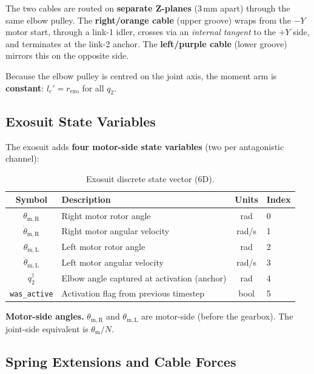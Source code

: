 \documentclass[11pt,a4paper]{article}
\begin{document}
The two cables are routed on \textbf{separate Z-planes} (3\,mm apart) through the same elbow pulley.
The \textbf{right/orange cable} (upper groove) wraps from the $-Y$ motor start, through a link-1 idler, crosses via an \emph{internal tangent} to the $+Y$ side, and terminates at the link-2 anchor.
The \textbf{left/purple cable} (lower groove) mirrors this on the opposite side.

Because the elbow pulley is centred on the joint axis, the moment arm is \textbf{constant}:
$l_c' = r_{\mathrm{exo}}$ for all $q_2$.


\subsection{Exosuit State Variables}

The exosuit adds \textbf{four motor-side state variables} (two per antagonistic channel):

\begin{table}[H]
\centering
\caption{Exosuit discrete state vector (6D).}
\begin{tabular}{clcl}
\toprule
\textbf{Symbol} & \textbf{Description} & \textbf{Units} & \textbf{Index} \\
\midrule
$\theta_{\mathrm{m,R}}$ & Right motor rotor angle & rad & 0 \\
$\dot{\theta}_{\mathrm{m,R}}$ & Right motor angular velocity & rad/s & 1 \\
$\theta_{\mathrm{m,L}}$ & Left motor rotor angle & rad & 2 \\
$\dot{\theta}_{\mathrm{m,L}}$ & Left motor angular velocity & rad/s & 3 \\
$q_2^{\dagger}$ & Elbow angle captured at activation (anchor) & rad & 4 \\
\texttt{was\_active} & Activation flag from previous timestep & bool & 5 \\
\bottomrule
\end{tabular}
\end{table}

\begin{warnbox}
\textbf{Motor-side angles.}
$\theta_{\mathrm{m,R}}$ and $\theta_{\mathrm{m,L}}$ are motor-side (before the gearbox).
The joint-side equivalent is $\theta_{\mathrm{m}} / N$.
\end{warnbox}


\subsection{Spring Extensions and Cable Forces}
\label{sec:exo_spring}
\end{document}
